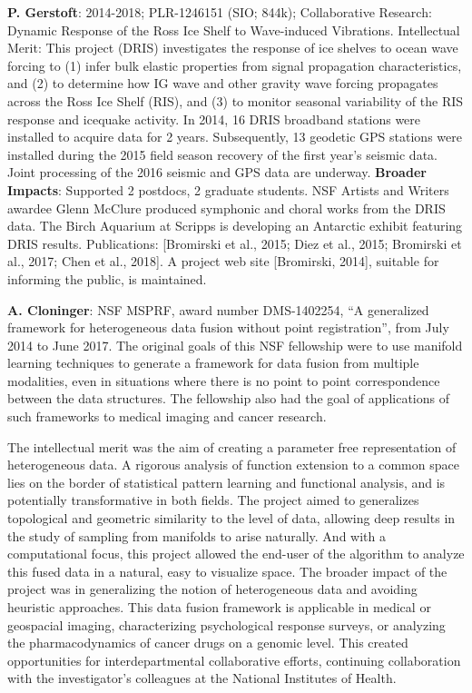 {\bf  P. Gerstoft}: 2014-2018; PLR-1246151 (SIO; 844k); Collaborative Research: Dynamic Response of the Ross Ice Shelf to Wave-induced Vibrations. Intellectual Merit: This project (DRIS) investigates the response of ice shelves to ocean wave forcing to (1) infer bulk elastic properties from signal propagation characteristics, and (2) to determine how IG wave and other gravity wave forcing propagates across the Ross Ice Shelf (RIS), and (3) to monitor seasonal variability of the RIS response and icequake activity. In 2014, 16 DRIS broadband stations were installed to acquire data for 2 years. Subsequently, 13 geodetic GPS stations were installed during the 2015 field season recovery of the first year’s seismic data. Joint processing of the 2016 seismic and GPS data are underway. {\bf Broader Impacts}: Supported 2 postdocs, 2 graduate students. NSF Artists and Writers awardee Glenn McClure produced symphonic and choral works from the DRIS data. The Birch Aquarium at Scripps is developing an Antarctic exhibit featuring DRIS results. Publications: [Bromirski et al., 2015; Diez et al., 2015; Bromirski et al., 2017; Chen et al., 2018]. A project web site [Bromirski, 2014], suitable for informing the public, is maintained. 



{\bf A. Cloninger}: NSF MSPRF, award number DMS-1402254, ``A generalized framework for heterogeneous data fusion without point registration'', from July 2014 to June 2017.  
The original goals of this NSF fellowship were to use manifold learning techniques to generate a framework for data fusion from multiple modalities, even in situations where there is no point to point correspondence between the data structures.  The fellowship also had the goal of applications of such frameworks to medical imaging and cancer research.   

The intellectual merit was the aim of creating a parameter free representation of heterogeneous data.  A rigorous analysis of function extension to a common space lies on the border of statistical pattern learning and functional analysis, and is potentially transformative in both fields.  The project aimed to generalizes topological and geometric similarity to the level of data, allowing deep results in the study of sampling from manifolds to arise naturally.  And with a computational focus, this project allowed the end-user of the algorithm to analyze this fused data in a natural, easy to visualize space. 
The broader impact of the project was in generalizing the notion of heterogeneous data and avoiding heuristic approaches.  This data fusion framework is applicable in medical or geospacial imaging, characterizing psychological response surveys, or analyzing the pharmacodynamics of cancer drugs on a genomic level.  This created opportunities for interdepartmental collaborative efforts, continuing collaboration with the investigator's colleagues at the National Institutes of Health.  

